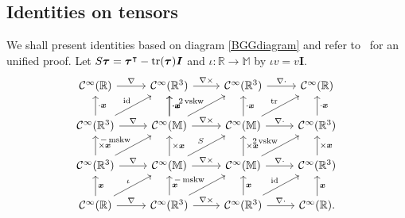 \subsection{Identities on tensors}
We shall present identities based on diagram \eqref{BGGdiagram} and refer to~\cite{ArnoldHu2020} for an unified proof. Let $S \boldsymbol  \tau = \boldsymbol  \tau^{\intercal} - \operatorname*{tr}(\boldsymbol  \tau) \boldsymbol  I$ and $\iota: \mathbb R\to \mathbb M$ by $\iota v = v \boldsymbol  I$. 
\begin{equation}\label{BGGdiagram}
\begin{tikzcd}
\mathcal C^{\infty}(\mathbb{R})  \arrow{r}{\nabla} &\mathcal C^{\infty}(\mathbb R^3) \arrow{r}{\nabla \times} &\mathcal C^{\infty}(\mathbb R^3) \arrow{r}{\nabla\cdot} & \mathcal C^{\infty}(\mathbb{R})\\
\mathcal C^{\infty}(\mathbb R^3)\arrow[u,swap,"\cdot \boldsymbol  x"] \arrow{r}{\nabla} \arrow[ur, "\mathrm{id}"]&\mathcal C^{\infty}(\mathbb {M}) \arrow[u,swap,"\cdot \boldsymbol  x"] \arrow[u,swap,"\cdot \boldsymbol  x"] \arrow{r}{\nabla\times } \arrow[ur, "2\vskw"]&\mathcal C^{\infty}(\mathbb{M}) \arrow[u,swap,"\cdot \boldsymbol  x"] \arrow{r}{\nabla\cdot}\arrow[ur, "\tr"] & \mathcal C^{\infty}(\mathbb R^3) \arrow[u,swap,"\cdot \boldsymbol  x"] \\
\mathcal C^{\infty}(\mathbb R^3)\arrow[u,swap,"\times \boldsymbol  x"]\arrow{r}{\nabla} \arrow[ur,"-\mskw"]&\mathcal C^{\infty}(\mathbb{M}) \arrow[u,swap,"\times \boldsymbol  x"] \arrow{r}{\nabla\times} \arrow[ur, "S"]&\mathcal C^{\infty}(\mathbb{M}) \arrow[u,swap,"\times \boldsymbol  x"] \arrow{r}{\nabla\cdot}\arrow[ur, "2\vskw"] & \mathcal C^{\infty}(\mathbb R^3) \arrow[u,swap,"\times \boldsymbol  x"]\\
\mathcal C^{\infty}(\mathbb{R})\arrow[u,swap,"\boldsymbol  x"]\arrow{r}{\nabla} \arrow[ur, "\iota"]&\mathcal C^{\infty}(\mathbb R^3) \arrow[u,swap,"\boldsymbol  x"] \arrow{r}{\nabla\times } \arrow[ur, "-\mskw"]&\mathcal C^{\infty}(\mathbb R^3)\arrow[u,swap,"\boldsymbol  x"] \arrow{r}{\nabla\cdot}\arrow[ur, "\mathrm{id}"] & \mathcal C^{\infty}(\mathbb{R}) \arrow[u,swap,"\boldsymbol  x"].
\end{tikzcd}
\end{equation}

